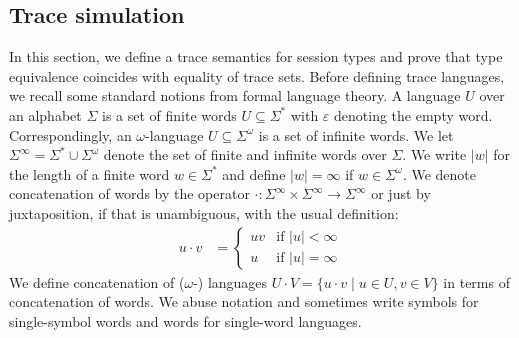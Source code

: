 \subsection{Trace simulation}
\label{sec:trace-simulation}

In this section, we define a trace semantics for session types and prove that type equivalence
coincides with equality of trace sets. Before defining trace languages, we recall some standard
notions from formal language theory. A language $U$ over an alphabet $\Sigma$ is a set of finite
words $U\subseteq \Sigma^*$ with $\varepsilon$ denoting the empty word. Correspondingly, an
$\omega$-language $U\subseteq\Sigma^\omega$ is a 
set of infinite words. We let $\Sigma^\infty = \Sigma^* \cup \Sigma^\omega$ denote the set of finite
and infinite words over $\Sigma$.
We write $|w|$ for the length of a finite word $w\in \Sigma^*$ and define
$|w| = \infty$ if $w \in \Sigma^\omega$. We denote concatenation of words by  the operator
$\cdot :
\Sigma^\infty \times \Sigma^\infty \to \Sigma^\infty$  or just by juxtaposition, if that is unambiguous, with the usual
definition:
\begin{align*}
  u \cdot v &=
              \begin{cases}
                u v & \text{if }|u|<\infty \\
                u & \text{if }|u|=\infty
              \end{cases}
\end{align*}
We define concatenation of ($\omega$-) languages $U\cdot V = \{u\cdot v \mid u\in U,
v \in V \}$ in terms of concatenation of words. 
We abuse notation and sometimes write symbols for single-symbol words and words for single-word
languages. 

